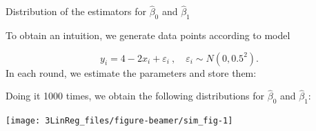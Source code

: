 \documentclass[
  10pt,
  ignorenonframetext,
]{beamer}
\newenvironment{Shaded}{\begin{snugshade}}{\end{snugshade}}
\newcommand{\AttributeTok}[1]{\textcolor[rgb]{0.13,0.29,0.53}{#1}}
\newcommand{\ConstantTok}[1]{\textcolor[rgb]{0.56,0.35,0.01}{#1}}
\newcommand{\ControlFlowTok}[1]{\textcolor[rgb]{0.13,0.29,0.53}{\textbf{#1}}}
\newcommand{\DecValTok}[1]{\textcolor[rgb]{0.00,0.00,0.81}{#1}}
\newcommand{\FloatTok}[1]{\textcolor[rgb]{0.00,0.00,0.81}{#1}}
\newcommand{\FunctionTok}[1]{\textcolor[rgb]{0.13,0.29,0.53}{\textbf{#1}}}
\newcommand{\NormalTok}[1]{#1}
\newcommand{\OtherTok}[1]{\textcolor[rgb]{0.56,0.35,0.01}{#1}}
\newcommand{\SpecialCharTok}[1]{\textcolor[rgb]{0.81,0.36,0.00}{\textbf{#1}}}
\begin{document}
\begin{frame}[fragile]
\begin{block}{Distribution of the estimators for \(\hat\beta_0\) and
\(\hat\beta_1\)}
\protect\hypertarget{distribution-of-the-estimators-for-hatbeta_0-and-hatbeta_1}{}
\vspace{2mm}

To obtain an intuition, we generate data points according to model

\[y_i = 4 - 2x_i + \varepsilon_i \ , \quad \varepsilon_i\sim N(0,0.5^2). \]
In each round, we estimate the parameters and store them: \tiny

\begin{Shaded}
\end{Shaded}

\normalsize Doing it 1000 times, we obtain the following distributions
for \(\hat\beta_0\) and \(\hat\beta_1\):

\begin{center}\texttt{[image: 3LinReg\_files/figure-beamer/sim\_fig-1]} \end{center}
\end{block}
\end{frame}
\end{document}
